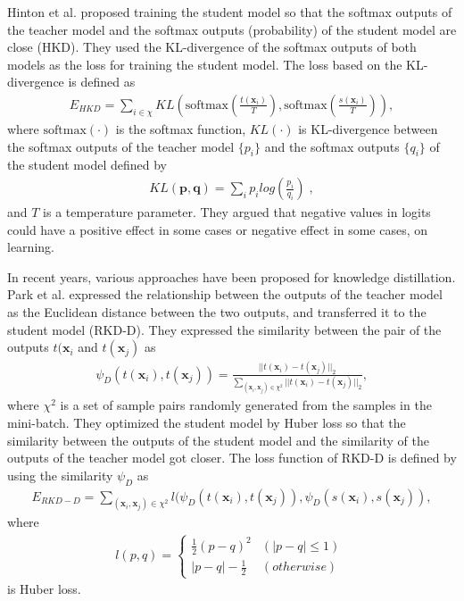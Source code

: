 \documentclass[a4paper,12pt]{article}
\begin{document}
Hinton et al. \cite{Hinton2015} proposed training the student model so that the softmax outputs of the teacher model and the softmax outputs (probability) of the student model are close (HKD).
They used the KL-divergence of the softmax outputs of both models as the loss for training the student model.
The loss based on the KL-divergence is defined as
\begin{align} \label{eq:Hinton}
    E_{HKD} = \sum_{i \in \chi} KL(\mbox{softmax}(\frac{t(\bm{x}_i)}{T}), \mbox{softmax}(\frac{s(\bm{x}_i)}{T})),
\end{align}
where $\mbox{softmax}(\cdot)$ is the softmax function,
$KL(\cdot)$ is KL-divergence between the softmax outputs of the teacher model $\{p_i\}$ and the softmax outputs $\{q_i\}$ of the student model defined by
\begin{align} \label{eq:KL-divergence}
KL(\bm{p}, \bm{q}) = \sum_{i} p_i log(\frac{p_i}{q_i}) \; ,
\end{align}
and $T$ is a temperature parameter.
They argued that negative values in logits could have a positive effect in some cases or negative effect in some cases, on learning.


In recent years, various approaches have been proposed for knowledge distillation.
Park et al. \cite{Park2019} expressed the relationship between the outputs of the teacher model as the Euclidean distance between the two outputs, and transferred it to the student model (RKD-D).
They expressed the similarity between the pair of the outputs $t(\bm{x}_i$ and $t(\bm{x}_j)$ as
\begin{align} \label{eq:psiD}
    \psi_D(t(\bm{x}_i), t(\bm{x}_j)) = \frac{||t(\bm{x}_i) - t(\bm{x}_j)||_2}{\sum_{(\bm{x}_i, \bm{x}_j) \in \chi^2} ||t(\bm{x}_i) - t(\bm{x}_j)||_2},
\end{align}
where $\chi^2$ is a set of sample pairs randomly generated from the samples in the mini-batch.
They optimized the student model by Huber loss so that the similarity between the outputs of the student model and the similarity of the outputs of the teacher model got closer.
The loss function of RKD-D is defined by using the similarity $\psi_D$ as
\begin{align} \label{eq:RKD-Dloss}
    E_{RKD-D} = \sum_{(\bm{x}_i, \bm{x}_j) \in \chi^2} l(\psi_D(t(\bm{x}_i), t(\bm{x}_j)), \psi_D(s(\bm{x}_i), s(\bm{x}_j)),
\end{align}
where
\begin{eqnarray} \label{eq:Huber}
l(p,q)=\left\{
\begin{array}{ll}
\frac{1}{2}(p-q)^2 & (|p-q| \leq 1) \\
|p-q|-\frac{1}{2} & (otherwise)
\end{array}
\right. \; 
\end{eqnarray} 
is Huber loss.
\end{document}
